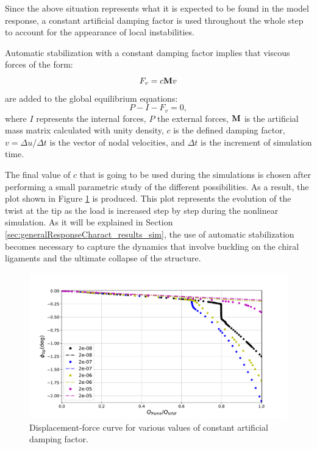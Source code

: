     Since the above situation represents what it is expected to be found in the model response, a constant artificial damping factor is used throughout the whole step to account for the appearance of local instabilities.

    Automatic stabilization with a constant damping factor implies that viscous forces of the form:
    \begin{equation}
      F_v = c \mathrm{\textbf{M}} v
    \end{equation}
    are added to the global equilibrium equations:
    \begin{equation}
      P - I - F_v = 0,
    \end{equation}
    where $I$ represents the internal forces, $P$ the external forces, $\mathrm{\textbf{M}}$ is the artificial mass matrix calculated with unity density, $c$ is the defined damping factor, $v = \Delta u / \Delta t$ is the vector of nodal velocities, and $\Delta t$ is the increment of simulation time.

    The final value of $c$ that is going to be used during the simulations is chosen after performing a small parametric study of the different possibilities. As a result, the plot shown in Figure \ref{fig:forceDisplacement-damp} is produced. This plot represents the evolution of the twist at the tip as the load is increased step by step during the nonlinear simulation. As it will be explained in Section \ref{sec:generalResponseCharact_results_sim}, the use of automatic stabilization becomes necessary to capture the dynamics that involve buckling on the chiral ligaments and the ultimate collapse of the structure.

    \begin{figure}[!htpb]
      \centering
      \includegraphics[width=0.8 \textwidth]{../figures/result-model/forceDisplacement-damp}
      \caption[Displacement-force curve for various values of constant artificial damping factor]{Displacement-force curve for various values of constant artificial damping factor.}\label{fig:forceDisplacement-damp}
    \end{figure}

